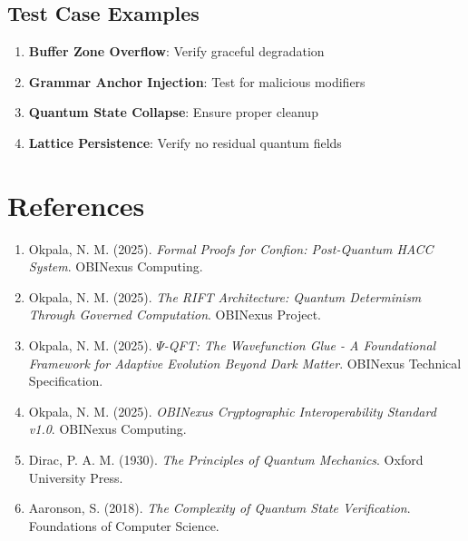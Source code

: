 \documentclass[12pt,a4paper]{article}
\begin{document}
\subsection{Test Case Examples}

\begin{tcolorbox}[colback=yellow!10!white,colframe=yellow!80!black,title=QA Test Suite]
\begin{enumerate}
    \item \textbf{Buffer Zone Overflow}: Verify graceful degradation
    \item \textbf{Grammar Anchor Injection}: Test for malicious modifiers
    \item \textbf{Quantum State Collapse}: Ensure proper cleanup
    \item \textbf{Lattice Persistence}: Verify no residual quantum fields
\end{enumerate}
\end{tcolorbox}

\section*{References}

\begin{enumerate}
    \item Okpala, N. M. (2025). \textit{Formal Proofs for Confion: Post-Quantum HACC System}. OBINexus Computing.
    
    \item Okpala, N. M. (2025). \textit{The RIFT Architecture: Quantum Determinism Through Governed Computation}. OBINexus Project.
    
    \item Okpala, N. M. (2025). \textit{$\Psi$-QFT: The Wavefunction Glue - A Foundational Framework for Adaptive Evolution Beyond Dark Matter}. OBINexus Technical Specification.
    
    \item Okpala, N. M. (2025). \textit{OBINexus Cryptographic Interoperability Standard v1.0}. OBINexus Computing.
    
    \item Dirac, P. A. M. (1930). \textit{The Principles of Quantum Mechanics}. Oxford University Press.
    
    \item Aaronson, S. (2018). \textit{The Complexity of Quantum State Verification}. Foundations of Computer Science.
\end{enumerate}
\end{document}
